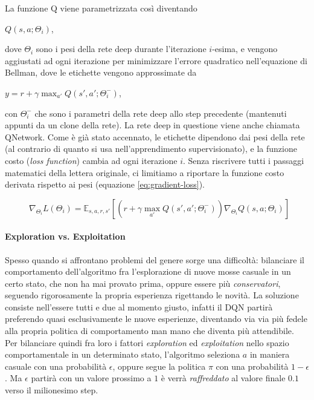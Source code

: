 \documentclass[twoside,twocolumn,10pt]{extarticle}
\theoremstyle{definition}
\begin{document}
		La funzione Q viene parametrizzata così diventando
		\begin{center}
			$Q(s, a; \Theta_i)$,
		\end{center}
		dove $\Theta_i$ sono i pesi della rete deep durante l'iterazione $i$-esima, e vengono aggiustati ad ogni iterazione per minimizzare l'errore quadratico nell'equazione di Bellman, dove le etichette vengono approssimate da
		\begin{center}
			$y = r + \gamma \max_{a'} Q(s', a'; \Theta_i^-)$,
		\end{center}
		con $\Theta_i^-$ che sono i parametri della rete deep allo step precedente (mantenuti appunti da un clone della rete). La rete deep in questione viene anche chiamata Q\texttwelveudash Network. Come è già stato accennato, le etichette dipendono dai pesi della rete (al contrario di quanto si usa nell'apprendimento supervisionato), e la funzione costo (\textit{loss function}) cambia ad ogni iterazione $i$. Senza riscrivere tutti i passaggi matematici della lettera originale, ci limitiamo a riportare la funzione costo derivata rispetto ai pesi (equazione \ref{eq:gradient-loss}).
		\begin{figure}
			\begin{equation}\label{eq:gradient-loss}
				\nabla_{\Theta_i} L(\Theta_i) = \mathbb{E}_{s, a, r, s'} [(r + \gamma \max_{a'} Q(s', a'; \Theta_i^-)) \nabla_{\Theta_i} Q(s, a; \Theta_i)]
			\end{equation}
		\end{figure}
	
		\paragraph{Exploration vs. Exploitation}
		Spesso quando si affrontano problemi del genere sorge una difficoltà: bilanciare il comportamento dell'algoritmo fra l'esplorazione di nuove mosse casuale in un certo stato, che non ha mai provato prima, oppure essere più \textit{conservatori}, seguendo rigorosamente la propria esperienza rigettando le novità. La soluzione consiste nell'essere tutti e due al momento giusto, infatti il DQN partirà preferendo quasi esclusivamente le nuove esperienze, diventando via via più fedele alla propria politica di comportamento man mano che diventa più attendibile.	Per bilanciare quindi fra loro i fattori \textit{exploration} ed \textit{exploitation} nello spazio comportamentale in un determinato stato, l'algoritmo seleziona $a$ in maniera casuale con una probabilità $\epsilon$, oppure segue la politica $\pi$ con una probabilità $1 - \epsilon$. Ma $\epsilon$ partirà con un valore prossimo a $1$ è verrà \textit{raffreddato} al valore finale $0.1$ verso il milionesimo step.
\end{document}
